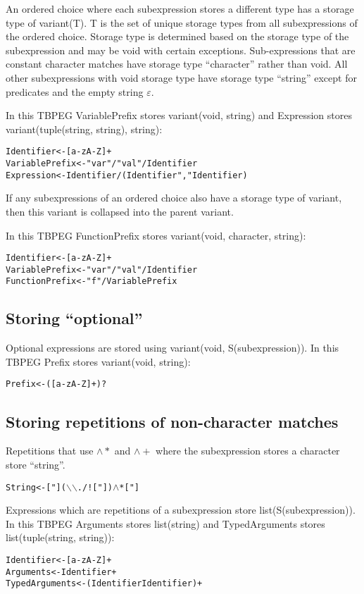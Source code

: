 \documentclass[a4paper,11pt]{article}
\begin{document}
An ordered choice where each subexpression stores a different type has a storage type of variant(T).
T is the set of unique storage types from all subexpressions of the ordered choice.
Storage type is determined based on the storage type of the subexpression and may be void with certain exceptions.
Sub-expressions that are constant character matches have storage type ``character'' rather than void.
All other subexpressions with void storage type have storage type ``string'' except for predicates and the empty string $\varepsilon$.

In this TBPEG VariablePrefix stores variant(void, string) and Expression stores variant(tuple(string, string), string):
\begin{alltt}
    Identifier     <- [a-zA-Z]+
    VariablePrefix <- "var" / "val" / Identifier
    Expression     <- Identifier / (Identifier "," Identifier)
\end{alltt}

If any subexpressions of an ordered choice also have a storage type of variant, then this variant is collapsed into the parent variant.

In this TBPEG FunctionPrefix stores variant(void, character, string):
\begin{alltt}
    Identifier     <- [a-zA-Z]+
    VariablePrefix <- "var" / "val" / Identifier
    FunctionPrefix <- "f" / VariablePrefix
\end{alltt}

\subsection{Storing ``optional''}
Optional expressions are stored using variant(void, S(subexpression)).
In this TBPEG Prefix stores variant(void, string):
\begin{alltt}
    Prefix <- ([a-zA-Z]+)?
\end{alltt}

\subsection{Storing repetitions of non-character matches}
Repetitions that use $\wedge *$ and $\wedge +$ where the subexpression stores a character store ``string''.
\begin{alltt}
    String <- ["] (\(\backslash\)\(\backslash\) . / ! ["] )\(\wedge\)* ["]
\end{alltt}

Expressions which are repetitions of a subexpression store list(S(subexpression)).
In this TBPEG Arguments stores list(string) and TypedArguments stores list(tuple(string, string)):
\begin{alltt}
    Identifier     <- [a-zA-Z]+
    Arguments      <- Identifier+
    TypedArguments <- (Identifier Identifier)+
\end{alltt}
\end{document}
